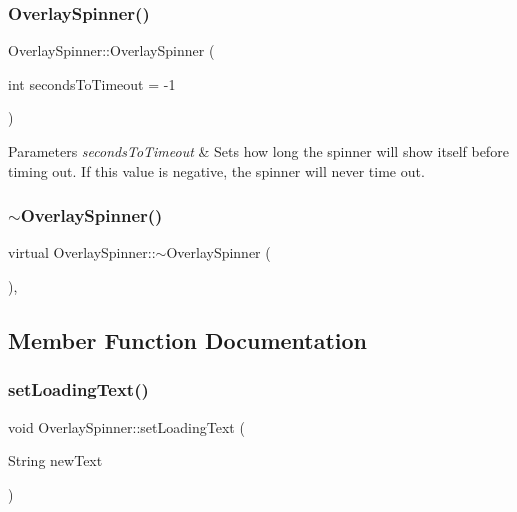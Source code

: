\subsubsection{\texorpdfstring{Overlay\+Spinner()}{OverlaySpinner()}}
{\footnotesize\ttfamily Overlay\+Spinner\+::\+Overlay\+Spinner (\begin{DoxyParamCaption}\item[{int}]{seconds\+To\+Timeout = {\ttfamily -\/1} }\end{DoxyParamCaption})}


\begin{DoxyParams}{Parameters}
{\em seconds\+To\+Timeout} & Sets how long the spinner will show itself before timing out. If this value is negative, the spinner will never time out. \\
\hline
\end{DoxyParams}
\mbox{\label{classOverlaySpinner_af8f285e5a0e631f24c1e0b917d1c4912}} 
\subsubsection{\texorpdfstring{$\sim$\+Overlay\+Spinner()}{~OverlaySpinner()}}
{\footnotesize\ttfamily virtual Overlay\+Spinner\+::$\sim$\+Overlay\+Spinner (\begin{DoxyParamCaption}{ }\end{DoxyParamCaption})\hspace{0.3cm}{\ttfamily [inline]}, {\ttfamily [virtual]}}



\subsection{Member Function Documentation}
\mbox{\label{classOverlaySpinner_aca59b7bd7666fb97c03c4cebfe310618}} 
\subsubsection{\texorpdfstring{set\+Loading\+Text()}{setLoadingText()}}
{\footnotesize\ttfamily void Overlay\+Spinner\+::set\+Loading\+Text (\begin{DoxyParamCaption}\item[{String}]{new\+Text }\end{DoxyParamCaption})}

